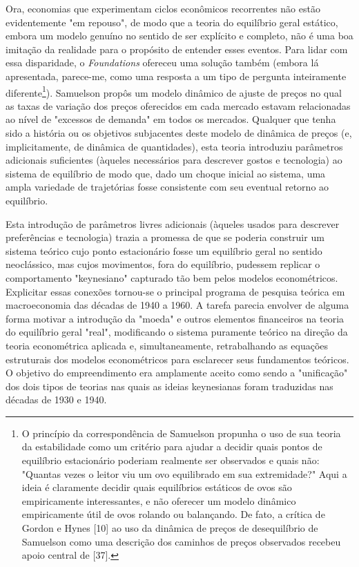 \documentclass[12pt]{article}
\begin{document}
Ora, economias que experimentam ciclos econômicos recorrentes não estão evidentemente "em repouso", de modo que a teoria do equilíbrio geral estático, embora um modelo genuíno no sentido de ser explícito e completo, não é uma boa imitação da realidade para o propósito de entender esses eventos. Para lidar com essa disparidade, o \textit{Foundations} ofereceu uma solução também (embora lá apresentada, parece-me, como uma resposta a um tipo de pergunta inteiramente diferente\footnote{O princípio da correspondência de Samuelson propunha o uso de sua teoria da estabilidade como um critério para ajudar a decidir quais pontos de equilíbrio estacionário poderiam realmente ser observados e quais não: "Quantas vezes o leitor viu um ovo equilibrado em sua extremidade?" Aqui a ideia é claramente decidir quais equilíbrios estáticos de ovos são empiricamente interessantes, e não oferecer um modelo dinâmico empiricamente útil de ovos rolando ou balançando. De fato, a crítica de Gordon e Hynes [10] ao uso da dinâmica de preços de desequilíbrio de Samuelson como uma descrição dos caminhos de preços observados recebeu apoio central de [37].}). Samuelson propôs um modelo dinâmico de ajuste de preços no qual as taxas de variação dos preços oferecidos em cada mercado estavam relacionadas ao nível de "excessos de demanda" em todos os mercados. Qualquer que tenha sido a história ou os objetivos subjacentes deste modelo de dinâmica de preços (e, implicitamente, de dinâmica de quantidades), esta teoria introduziu parâmetros adicionais suficientes (àqueles necessários para descrever gostos e tecnologia) ao sistema de equilíbrio de modo que, dado um choque inicial ao sistema, uma ampla variedade de trajetórias fosse consistente com seu eventual retorno ao equilíbrio.

Esta introdução de parâmetros livres adicionais (àqueles usados para descrever preferências e tecnologia) trazia a promessa de que se poderia construir um sistema teórico cujo ponto estacionário fosse um equilíbrio geral no sentido neoclássico, mas cujos movimentos, fora do equilíbrio, pudessem replicar o comportamento "keynesiano" capturado tão bem pelos modelos econométricos. Explicitar essas conexões tornou-se o principal programa de pesquisa teórica em macroeconomia das décadas de 1940 a 1960. A tarefa parecia envolver de alguma forma motivar a introdução da "moeda" e outros elementos financeiros na teoria do equilíbrio geral "real", modificando o sistema puramente teórico na direção da teoria econométrica aplicada e, simultaneamente, retrabalhando as equações estruturais dos modelos econométricos para esclarecer seus fundamentos teóricos. O objetivo do empreendimento era amplamente aceito como sendo a "unificação" dos dois tipos de teorias nas quais as ideias keynesianas foram traduzidas nas décadas de 1930 e 1940.
\end{document}

